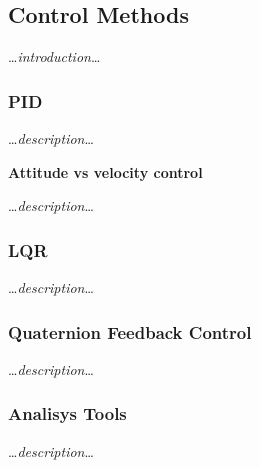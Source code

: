 \subsection{Control Methods}
    \dots\textit{introduction}\dots
    
    \subsubsection{PID}
        \dots\textit{description}\dots
        
        \textbf{Attitude vs velocity control}

            \dots\textit{description}\dots
    
    \subsubsection{LQR}
        \dots\textit{description}\dots

    \subsubsection{Quaternion Feedback Control}
        \dots\textit{description}\dots
    
    \subsubsection{Analisys Tools}
        \dots\textit{description}\dots